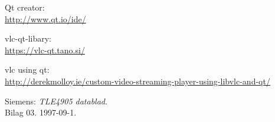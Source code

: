 \begin{thebibliography}{2}
 Qt creator: \\
\url{http://www.qt.io/ide/}

 vlc-qt-libary: \\
\url{https://vlc-qt.tano.si/}

 vlc using qt: \\
\url{http://derekmolloy.ie/custom-video-streaming-player-using-libvlc-and-qt/}

 Siemens: \textit{TLE4905 datablad}. \\
Bilag 03. 1997-09-1.

\end{thebibliography}